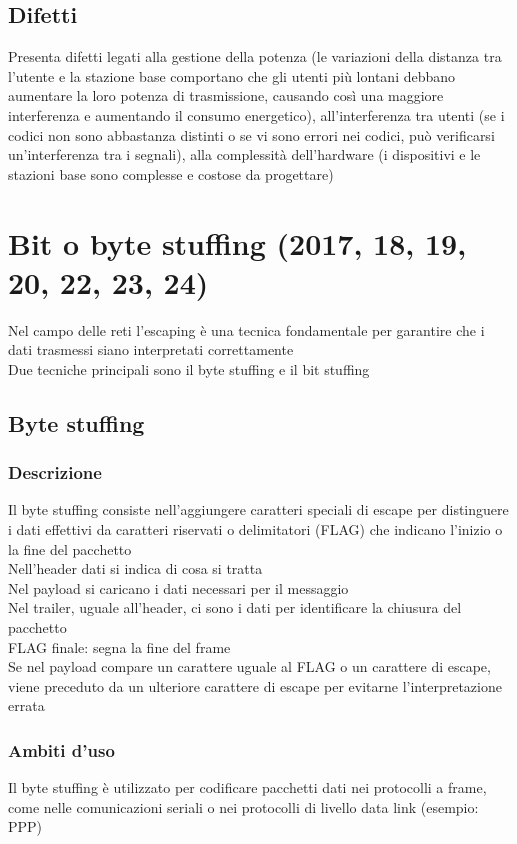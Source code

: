 \documentclass[10pt,oneside,a4paper]{article}
\begin{document}
\subsection{Difetti}
Presenta difetti legati alla gestione della potenza (le variazioni della distanza tra l'utente e la stazione base comportano che gli utenti più lontani debbano aumentare la loro potenza di trasmissione, causando così una maggiore interferenza e aumentando il consumo energetico), all'interferenza tra utenti (se i codici non sono abbastanza distinti o se vi sono errori nei codici, può verificarsi un'interferenza tra i segnali), alla complessità dell'hardware (i dispositivi e le stazioni base sono complesse e costose da progettare)
\section{Bit o byte stuffing (2017, 18, 19, 20, 22, 23, 24)}
Nel campo delle reti l'escaping è una tecnica fondamentale per garantire che i dati trasmessi siano interpretati correttamente\\
Due tecniche principali sono il byte stuffing e il bit stuffing
\subsection{Byte stuffing}
\subsubsection{Descrizione}
Il byte stuffing consiste nell'aggiungere caratteri speciali di escape per distinguere i dati effettivi da caratteri riservati o delimitatori (FLAG) che indicano l'inizio o la fine del pacchetto\\
Nell'header dati si indica di cosa si tratta\\
Nel payload si caricano i dati necessari per il messaggio\\
Nel trailer, uguale all'header, ci sono i dati per identificare la chiusura del pacchetto\\
FLAG finale: segna la fine del frame\\
Se nel payload compare un carattere uguale al FLAG o un carattere di escape, viene preceduto da un ulteriore carattere di escape per evitarne l'interpretazione errata
\subsubsection{Ambiti d'uso}
Il byte stuffing è utilizzato per codificare pacchetti dati nei protocolli a frame, come nelle comunicazioni seriali o nei protocolli di livello data link (esempio: PPP)
\end{document}
